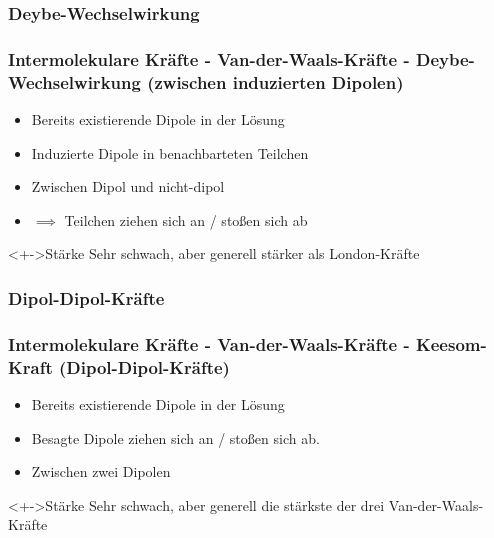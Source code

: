 \subsubsection{Deybe-Wechselwirkung}
\begin{frame}
\frametitle{Intermolekulare Kräfte - Van-der-Waals-Kräfte - Deybe-Wechselwirkung (zwischen induzierten Dipolen)}
\begin{itemize}
	\item<+-> Bereits existierende Dipole in der Lösung
	\item<+-> Induzierte Dipole in benachbarteten Teilchen
	\item<+-> Zwischen Dipol und nicht-dipol
	\item<+-> $\implies$ Teilchen ziehen sich an / stoßen sich ab
\end{itemize}
\begin{block}<+->{Stärke}
	Sehr schwach, aber generell stärker als London-Kräfte
\end{block}

\end{frame}

\subsubsection{Dipol-Dipol-Kräfte}
\begin{frame}
\frametitle{Intermolekulare Kräfte - Van-der-Waals-Kräfte - Keesom-Kraft (Dipol-Dipol-Kräfte)}
\begin{itemize}
	\item<+-> Bereits existierende Dipole in der Lösung
	\item<+-> Besagte Dipole ziehen sich an / stoßen sich ab.
	\item<+-> Zwischen zwei Dipolen
\end{itemize}
\begin{block}<+->{Stärke}
	Sehr schwach, aber generell die stärkste der drei Van-der-Waals-Kräfte
\end{block}
\end{frame}

